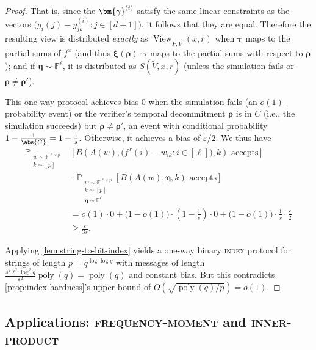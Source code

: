 \documentclass[a4paper,UKenglish,cleveref, autoref, thm-restate]{lipics-v2021}
\theoremstyle{definition}
\DeclareMathOperator{\view}{View}
\newcommand{\field}{\mathbb{F}}
\renewcommand{\P}{\mathbb P}
\newcommand{\poly}{\operatorname{poly}}
\newcommand{\eps}{\varepsilon}
\newcommand{\indexproblem}{\normalfont\textsc{index}\xspace}
\newcommand{\frequencymoment}{\normalfont\textsc{frequency-moment}\xspace}
\newcommand{\innerproductproblem}{\normalfont\textsc{inner-product}\xspace}
\newcommand{\pcommitlength}{p}
\newcommand{\pcommitstring}{y}
\newcommand{\degree}{d}
\newcommand{\fieldsize}{q}
\newcommand{\fingerprinttuple}{\bm{\rho}}
\def\fe#1{
    \ifnum#1=1
        \alpha
    \else
    \ifnum#1=2
        \beta
    \else
    \ifnum#1=3
        \gamma
    \fi\fi\fi
}
\begin{document}
\begin{proof}
     That is, since the $\bm{\fe3}^{(i)}$ satisfy the same linear constraints as the vectors $\big(g_i(j) - \pcommitstring^{(i)}_{jk} : j \in [\degree + 1]\big)$, it follows that they are equal. Therefore the resulting view is distributed \emph{exactly} as $\view_{P, \widetilde V}(x, r)$ when $\bm{\tau}$ maps to the partial sums of $f^x$ (and thus $\bm{\xi}(\fingerprinttuple) \cdot \tau$ maps to the partial sums with respect to $\fingerprinttuple$); and if $\bm{\eta} \sim \field^{\ell}$, it is distributed as $S(\widetilde V, x, r)$ (unless the simulation fails or $\fingerprinttuple \neq \fingerprinttuple'$).

    This one-way protocol achieves bias $0$ when the simulation fails (an $o(1)$-probability event) or the verifier's temporal decommitment $\fingerprinttuple$ is in $C$ (i.e., the simulation succeeds) but $\fingerprinttuple  \neq \fingerprinttuple'$, an event with conditional probability $1 -\frac1{\abs{C}} = 1 - \frac1{s}$. Otherwise, it achieves a bias of $\eps/2$. We thus have
    \begin{align*}
        \P_{\substack{w \sim \field^{\ell \times \pcommitlength}\\k \sim [\pcommitlength]}}&\left[B\left(A(w), \big(f^x(i) - w_{ik} : i \in [\ell]\big), k\right)\text{ accepts}\right]\\
        &- \P_{\substack{w \sim \field^{\ell \times \pcommitlength}\\k \sim [\pcommitlength]\\\bm{\eta} \sim \field^\ell}}\left[B\left(A(w), \bm{\eta}, k\right)\text{ accepts}\right]\\
        &= o(1) \cdot 0 + \big(1 - o(1)\big) \cdot \left(1 - \frac1 s\right) \cdot 0 + \big(1 - o(1)\big) \cdot \frac1 s \cdot \frac{\eps}{2}\\
        &\geq \frac{\eps}{3s}.
    \end{align*}

    Applying \cref{lem:string-to-bit-index} yields a one-way binary \indexproblem protocol for strings of length $\pcommitlength = \fieldsize^{\log\log \fieldsize} $ with messages of length $\frac{s^2 \ell^2 \log^2 \fieldsize}{\eps^2} \poly(\fieldsize) = \poly(\fieldsize)$ and constant bias. But this contradicts \cref{prop:index-hardness}'s upper bound of $O\left(\sqrt{\poly(\fieldsize)/\pcommitlength}\right) = o(1)$.
\end{proof}

\subsection{Applications: \frequencymoment and \innerproductproblem}
\label{sec:sumcheck-applications}
\end{document}

